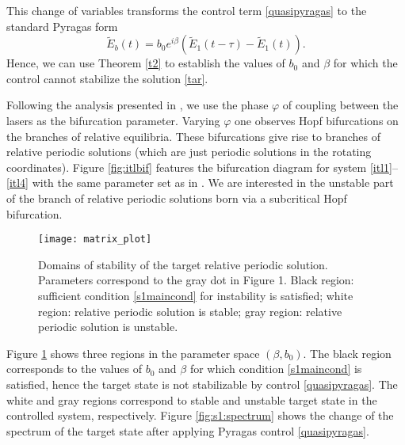 \documentclass{article}
\let\temp\phi
\let\phi\varphi
\let\varphi\temp
\let\temp\epsilon
\let\epsilon\varepsilon
\let\varepsilon\epsilon
\begin{document}
This change of variables transforms the control term \eqref{quasipyragas} to the standard Pyragas form
\begin{equation}\label{quasipyragas:rot}
\tilde{E}_b (t) = b_0 e^{i \beta} (\tilde{E}_1(t-\tau) - \tilde{E}_1(t) ).
\end{equation}
%
Hence, we can use Theorem \ref{t2} to establish the values of $b_0$ and $\beta$ for which
the control cannot stabilize the solution \eqref{tar}.

Following the analysis presented in \cite{FiedlerYanchuk}, we use the phase $\phi$ of coupling between the lasers as the bifurcation parameter. Varying $\phi$ one observes Hopf bifurcations on the branches of relative equilibria. These bifurcations give rise to branches of relative periodic solutions (which are just periodic solutions in the rotating coordinates). Figure \ref{fig:itlbif} features the bifurcation diagram for system \eqref{itl1}--\eqref{itl4} with the same parameter set as in \cite{FiedlerYanchuk}. We are interested in the unstable part of the branch of relative periodic solutions born via a subcritical Hopf bifurcation.

\begin{figure}[H]
	\centering
	\texttt{[image: matrix\_plot]}
	\caption{Domains of stability of the target relative periodic solution.
		Parameters correspond to the gray dot in Figure 1.
		Black region: sufficient condition \eqref{s1maincond} for instability is satisfied; white region: relative periodic solution is stable; gray region: relative periodic solution is unstable.}
	\label{fig:domains}
\end{figure}

Figure \ref{fig:domains} shows three regions in the parameter space $(\beta, b_0)$. The black region corresponds to the values of $b_0$ and $\beta$ for which condition \eqref{s1maincond} is satisfied, hence the target state is not stabilizable by control \eqref{quasipyragas}. The white and gray regions correspond to stable and unstable target state in the controlled system, respectively.
Figure \ref{fig:s1:spectrum} shows the change of the spectrum of the target state after applying Pyragas control \eqref{quasipyragas}.
\end{document}
